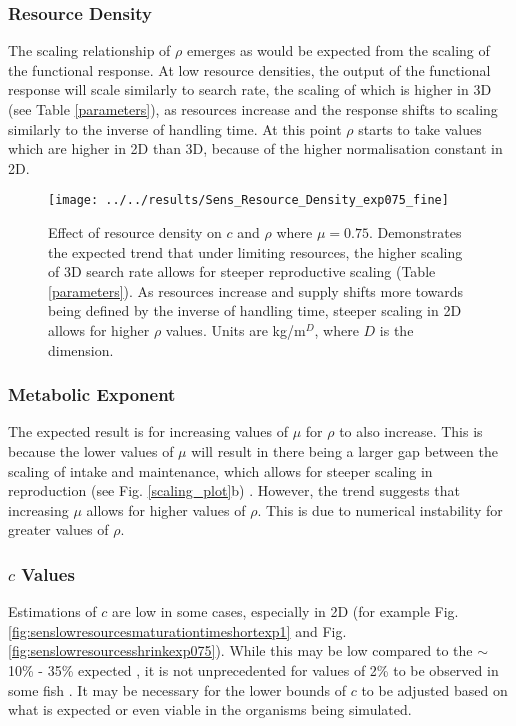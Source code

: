 \documentclass[a4paper, 11pt, hidelinks]{article} %
\begin{document}
	\subsubsection{Resource Density}
	The scaling relationship of $\rho$ emerges as would be expected from the scaling of the functional response.  At low resource densities, the output of the functional response will scale similarly to search rate, the scaling of which is higher in 3D (see Table \ref{parameters}), as resources increase and the response shifts to scaling similarly to the inverse of handling time.  At this point $\rho$ starts to take values which are higher in 2D than 3D, because of the higher normalisation constant in 2D.
	
	\begin{figure}[h!]
		\centering
		\texttt{[image: ../../results/Sens\_Resource\_Density\_exp075\_fine]}
		\caption{Effect of resource density on $c$ and $\rho$ where $\mu = 0.75$.  Demonstrates the expected trend that under limiting resources, the higher scaling of 3D search rate  allows for steeper reproductive scaling (Table \ref{parameters}).  As resources increase and supply shifts more towards being defined by the inverse of handling time, steeper scaling in 2D allows for higher $\rho$ values.  Units are kg/m$^D$, where $D$ is the dimension.}
		\label{fig:sensresourcedensityexp075fine}
	\end{figure}

	\subsubsection{Metabolic Exponent}
	The expected result is for increasing values of $\mu$ for $\rho$ to also increase.  This is because the lower values of $\mu$ will result in there being a larger gap between the scaling of intake and maintenance, which allows for steeper scaling in reproduction (see Fig. \ref{scaling_plot}b) \parencite{Marshall2019}.  
	However, the trend suggests that increasing $\mu$ allows for higher values of $\rho$.  This is due to numerical instability for greater values of $ \rho $.
		
	\subsubsection{$c$ Values}
	Estimations of $c$ are low in some cases, especially in 2D (for example Fig. \ref{fig:senslowresourcesmaturationtimeshortexp1} and Fig. \ref{fig:senslowresourcesshrinkexp075}).  While this may be low compared to the $\sim$10\% - 35\% expected \parencite{Benoit2018, Fontoura2009, Roff1983, Wootton1985}, it is not unprecedented for values of 2\% to be observed in some fish \parencite{Gunderson1997}.  
	It may be necessary for the lower bounds of $c$ to be adjusted based on what is expected or even viable in the organisms being simulated.
		
\end{document}
